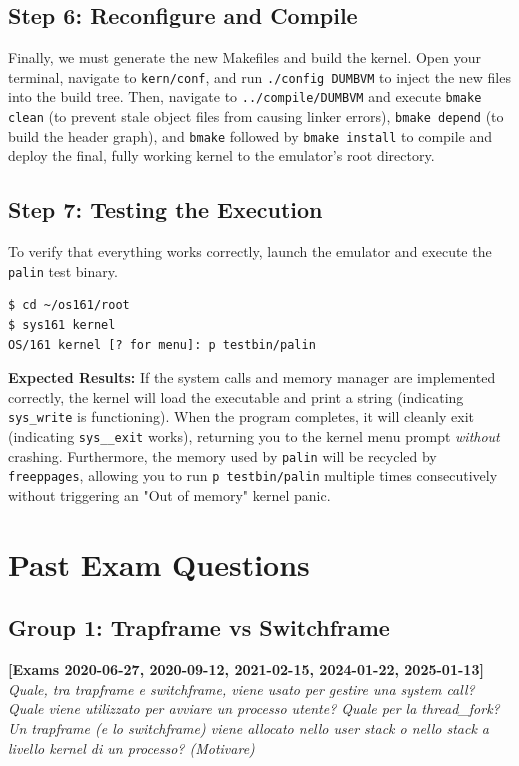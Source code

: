\subsection{Step 6: Reconfigure and Compile}
Finally, we must generate the new Makefiles and build the kernel. Open your terminal, navigate to \texttt{kern/conf}, and run \texttt{./config DUMBVM} to inject the new files into the build tree. Then, navigate to \texttt{../compile/DUMBVM} and execute \texttt{bmake clean} (to prevent stale object files from causing linker errors), \texttt{bmake depend} (to build the header graph), and \texttt{bmake} followed by \texttt{bmake install} to compile and deploy the final, fully working kernel to the emulator's root directory.

\subsection{Step 7: Testing the Execution}
To verify that everything works correctly, launch the emulator and execute the \texttt{palin} test binary.

\begin{verbatim}
$ cd ~/os161/root
$ sys161 kernel
OS/161 kernel [? for menu]: p testbin/palin
\end{verbatim}

\textbf{Expected Results:}
If the system calls and memory manager are implemented correctly, the kernel will load the executable and print a string (indicating \texttt{sys\_write} is functioning). When the program completes, it will cleanly exit (indicating \texttt{sys\_\_exit} works), returning you to the kernel menu prompt \textit{without} crashing. Furthermore, the memory used by \texttt{palin} will be recycled by \texttt{freeppages}, allowing you to run \texttt{p testbin/palin} multiple times consecutively without triggering an "Out of memory" kernel panic.

\newpage

\section*{Past Exam Questions}

\subsection*{Group 1: Trapframe vs Switchframe}

\textbf{[Exams 2020-06-27, 2020-09-12, 2021-02-15, 2024-01-22, 2025-01-13]}
\textit{Quale, tra trapframe e switchframe, viene usato per gestire una system call? Quale viene utilizzato per avviare un processo utente? Quale per la thread\_fork? Un trapframe (e lo switchframe) viene allocato nello user stack o nello stack a livello kernel di un processo? (Motivare)}

